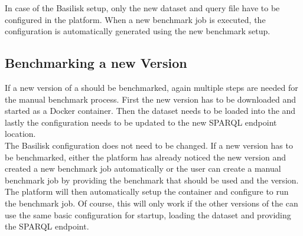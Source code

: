 In case of the Basilisk setup, only the new dataset and query file have to be configured in the platform.
When a new benchmark job is executed, the \iguana{} configuration is automatically generated using the new benchmark setup.


\subsection{Benchmarking a new Version}
If a new version of a \ts{} should be benchmarked, again multiple steps are needed for the manual benchmark process.
First the new version has to be downloaded and started as a Docker container.
Then the dataset needs to be loaded into the \ts{} and lastly the \iguana{} configuration needs to be updated to the new SPARQL endpoint location.
\\

The Basilisk configuration does not need to be changed.
If a new version has to be benchmarked, either the platform has already noticed the new version and created a new benchmark job automatically or the user can create a manual benchmark job by providing the benchmark that should be used and the \ts{} version.
The platform will then automatically setup the container and configure \iguana{} to run the benchmark job.
Of course, this will only work if the other versions of the \ts{} can use the same basic configuration for startup, loading the dataset and providing the SPARQL endpoint.






